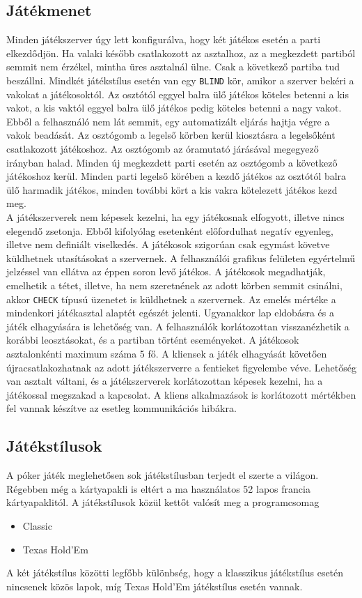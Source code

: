 \subsection{Játékmenet}
Minden játékszerver úgy lett konfigurálva, hogy két játékos esetén a parti elkezdődjön. Ha valaki később csatlakozott az asztalhoz, az a megkezdett partiból semmit nem érzékel, mintha üres asztalnál ülne. Csak a következő partiba tud beszállni. Mindkét játékstílus esetén van egy \texttt{BLIND} kör, amikor a szerver bekéri a vakokat a játékosoktól. Az osztótól eggyel balra ülő játékos köteles betenni a kis vakot, a kis vaktól eggyel balra ülő játékos pedig köteles betenni a nagy vakot. Ebből a felhasználó nem lát semmit, egy automatizált eljárás hajtja végre a vakok beadását. Az osztógomb  a legelső körben kerül kiosztásra a legelsőként csatlakozott játékoshoz. Az osztógomb az óramutató járásával megegyező irányban halad. Minden új megkezdett parti esetén az osztógomb a következő játékoshoz kerül. Minden parti legelső körében a kezdő játékos az osztótól balra ülő harmadik játékos, minden további kört a kis vakra kötelezett játékos kezd meg.  \\
A játékszerverek nem képesek kezelni, ha egy játékosnak elfogyott, illetve nincs elegendő zsetonja. Ebből kifolyólag esetenként előfordulhat negatív egyenleg, illetve nem definiált viselkedés. A játékosok szigorúan csak egymást követve küldhetnek utasításokat a szervernek. A felhasználói grafikus felületen egyértelmű jelzéssel van ellátva az éppen soron levő játékos. A játékosok megadhatják, emelhetik a tétet, illetve, ha nem szeretnének az adott körben semmit csinálni, akkor \texttt{CHECK} típusú üzenetet is küldhetnek a szervernek. Az emelés mértéke a mindenkori játékasztal alaptét egészét jelenti. Ugyanakkor lap eldobásra és a játék elhagyására is lehetőség van. A felhasználók korlátozottan visszanézhetik a korábbi leosztásokat, és a partiban történt eseményeket. A játékosok asztalonkénti maximum száma 5 fő. A kliensek a játék elhagyását követően újracsatlakozhatnak az adott játékszerverre a fentieket figyelembe véve. Lehetőség van asztalt váltani, és a játékszerverek korlátozottan képesek kezelni, ha a játékossal megszakad a kapcsolat. A kliens alkalmazások is korlátozott mértékben fel vannak készítve az esetleg kommunikációs hibákra.

\clearpage

\subsection{Játékstílusok} \label{subsubsec:game_styles}
A póker játék meglehetősen sok játékstílusban terjedt el szerte a világon. Régebben még a kártyapakli is eltért a ma használatos 52 lapos francia kártyapaklitól. A játékstílusok közül kettőt valósít meg a programcsomag
\begin{itemize}[leftmargin=2cm]
\item Classic \cite{five_card_draw}
\item Texas Hold'Em \cite{texas_holdem}
\end{itemize}
A két játékstílus közötti legfőbb különbség, hogy a klasszikus játékstílus esetén nincsenek közös lapok, míg Texas Hold'Em játékstílus esetén vannak.

